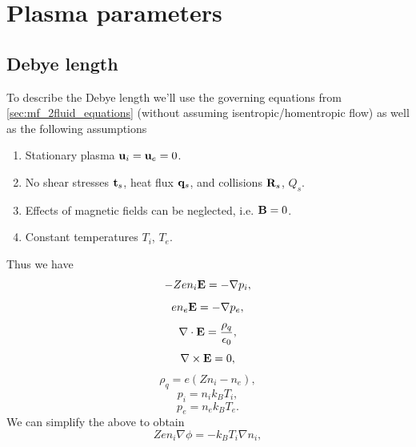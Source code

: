 \documentclass[a4paper,11pt]{report}
\begin{document}
\chapter{Plasma parameters}

\section{Debye length}
To describe the Debye length we'll use the governing equations from \cref{sec:mf_2fluid_equations} (without assuming isentropic/homentropic flow) as well as the following assumptions
\begin{enumerate}
    \item Stationary plasma $\mathbf{u}_i = \mathbf{u}_e = 0$.
    \item No shear stresses $\mathbf{t}_s$, heat flux $\mathbf{q}_s$, and collisions $\mathbf{R}_s$, $Q_s$.
    \item Effects of magnetic fields can be neglected, i.e. $\mathbf{B}=0$.
    \item Constant temperatures $T_i$, $T_e$.
\end{enumerate}
Thus we have
\begin{equation*}
    -Zen_i\mathbf{E} = -\nabla p_i,
\end{equation*}
\begin{equation*}
    en_e\mathbf{E} = -\nabla p_e,
\end{equation*}
\begin{equation*}
    \nabla \cdot \mathbf{E} = \frac{\rho_q}{\epsilon_0},
\end{equation*}
\begin{equation*}
    \nabla \times \mathbf{E} = 0,
\end{equation*}
\begin{equation*}
    \rho_q = e(Zn_i - n_e),
\end{equation*}
\begin{equation*}
    p_i = n_i k_B T_i,
\end{equation*}
\begin{equation*}
    p_e = n_e k_B T_e.
\end{equation*}
We can simplify the above to obtain
\begin{equation*}
    Zen_i \nabla \phi = -k_B T_i \nabla n_i,
\end{equation*}
\end{document}
